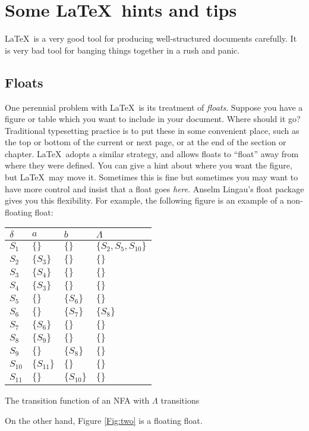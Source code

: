 \chapter{Some \LaTeX\ hints and tips}\label{C:ex}\LaTeX\ is a very good tool for producing well-structured documents carefully. It is very bad tool for banging things together in a rush and panic. \section{Floats}One perennial problem with \LaTeX\ is its treatment of \emph{floats}.  Suppose you have a figure or table which you want to include in your document. Where should it go? Traditional typesetting practice is to put these in some convenient place, such as the top or bottom of the current or next page, or at the end of the section or chapter.  \LaTeX\ adopts a similar strategy, and allows floats to ``float'' away from where they were defined. You can give a hint about where you want the figure, but \LaTeX\ may move it. Sometimes this is fine but sometimes you may want to have more control and insist that a float goes \emph{here}. Anselm Lingau's \textsf{float} package gives you this flexibility. For example, the following figure is an example of a non-floating float:\begin{fig}[H]
\begin{center}\begin{tabular}{l|lll}$\delta$ & $\mathit{a}$ & $\mathit{b}$ & $\Lambda$ \\ \hline $S_{1}$  & $\{\}$       & $\{\}$      & $\{S_{2}, S_{5}, S_{10}\}$\\$S_{2}$  & $\{S_{3}\}$  & $\{\}$      & $\{\}$\\$S_{3}$  & $\{S_{4}\}$  & $\{\}$      & $\{\}$\\$S_{4}$  & $\{S_{3}\}$  & $\{\}$      & $\{\}$\\$S_{5}$  & $\{\}$       & $\{S_{6}\}$ & $\{\}$\\$S_{6}$  & $\{\}$       & $\{S_{7}\}$ & $\{S_{8}\}$\\$S_{7}$  & $\{S_{6}\}$  & $\{\}$      & $\{\}$\\$S_{8}$  & $\{S_{9}\}$  & $\{\}$      & $\{\}$\\$S_{9}$  & $\{\}$       & $\{S_{8}\}$ & $\{\}$\\$S_{10}$ & $\{S_{11}\}$ & $\{\}$      & $\{\}$\\$S_{11}$ & $\{\}$       & $\{S_{10}\}$& $\{\}$\\ \end{tabular}\caption{The transition function of an NFA with $\Lambda$  transitions}

\end{center}
\end{fig}On the other hand, Figure \ref{Fig:two} is a floating float. 




